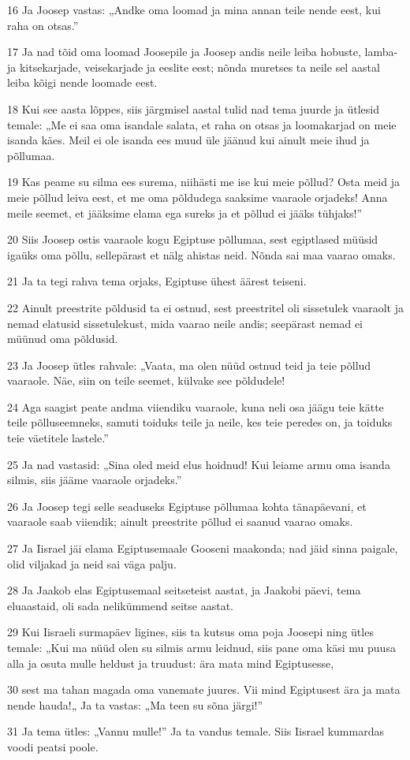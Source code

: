 \par 16 Ja Joosep vastas: „Andke oma loomad ja mina annan teile nende eest, kui raha on otsas.”
\par 17 Ja nad tõid oma loomad Joosepile ja Joosep andis neile leiba hobuste, lamba- ja kitsekarjade, veisekarjade ja eeslite eest; nõnda muretses ta neile sel aastal leiba kõigi nende loomade eest.
\par 18 Kui see aasta lõppes, siis järgmisel aastal tulid nad tema juurde ja ütlesid temale: „Me ei saa oma isandale salata, et raha on otsas ja loomakarjad on meie isanda käes. Meil ei ole isanda ees muud üle jäänud kui ainult meie ihud ja põllumaa.
\par 19 Kas peame su silma ees surema, niihästi me ise kui meie põllud? Osta meid ja meie põllud leiva eest, et me oma põldudega saaksime vaaraole orjadeks! Anna meile seemet, et jääksime elama ega sureks ja et põllud ei jääks tühjaks!”
\par 20 Siis Joosep ostis vaaraole kogu Egiptuse põllumaa, sest egiptlased müüsid igaüks oma põllu, sellepärast et nälg ahistas neid. Nõnda sai maa vaarao omaks.
\par 21 Ja ta tegi rahva tema orjaks, Egiptuse ühest äärest teiseni.
\par 22 Ainult preestrite põldusid ta ei ostnud, sest preestritel oli sissetulek vaaraolt ja nemad elatusid sissetulekust, mida vaarao neile andis; seepärast nemad ei müünud oma põldusid.
\par 23 Ja Joosep ütles rahvale: „Vaata, ma olen nüüd ostnud teid ja teie põllud vaaraole. Näe, siin on teile seemet, külvake see põldudele!
\par 24 Aga saagist peate andma viiendiku vaaraole, kuna neli osa jäägu teie kätte teile põlluseemneks, samuti toiduks teile ja neile, kes teie peredes on, ja toiduks teie väetitele lastele.”
\par 25 Ja nad vastasid: „Sina oled meid elus hoidnud! Kui leiame armu oma isanda silmis, siis jääme vaaraole orjadeks.”
\par 26 Ja Joosep tegi selle seaduseks Egiptuse põllumaa kohta tänapäevani, et vaaraole saab viiendik; ainult preestrite põllud ei saanud vaarao omaks.
\par 27 Ja Iisrael jäi elama Egiptusemaale Gooseni maakonda; nad jäid sinna paigale, olid viljakad ja neid sai väga palju.
\par 28 Ja Jaakob elas Egiptusemaal seitseteist aastat, ja Jaakobi päevi, tema eluaastaid, oli sada nelikümmend seitse aastat.
\par 29 Kui Iisraeli surmapäev ligines, siis ta kutsus oma poja Joosepi ning ütles temale: „Kui ma nüüd olen su silmis armu leidnud, siis pane oma käsi mu puusa alla ja osuta mulle heldust ja truudust: ära mata mind Egiptusesse,
\par 30 sest ma tahan magada oma vanemate juures. Vii mind Egiptusest ära ja mata nende hauda!„ Ja ta vastas: „Ma teen su sõna järgi!”
\par 31 Ja tema ütles: „Vannu mulle!” Ja ta vandus temale. Siis Iisrael kummardas voodi peatsi poole.

